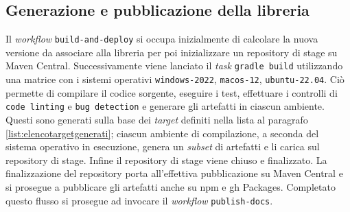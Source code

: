 \documentclass[12pt,a4paper,openright,twoside]{book}
\begin{document}
\subsection{Generazione e pubblicazione della libreria}
Il \textit{workflow} \texttt{build-and-deploy} si occupa inizialmente di
calcolare la nuova versione da associare
alla libreria per poi inizializzare un repository di stage su Maven Central.
Successivamente viene lanciato il \textit{task} \texttt{gradle build} utilizzando una matrice con i sistemi operativi
 \texttt{windows-2022}, \texttt{macos-12}, \texttt{ubuntu-22.04}. Ciò permette di compilare il codice sorgente, 
 eseguire i test, effettuare i controlli di \texttt{code linting} e \texttt{bug detection} e generare gli artefatti
 in ciascun ambiente. Questi sono generati sulla base dei \textit{target} definiti nella lista al paragrafo \ref{list:elencotargetgenerati};
ciascun ambiente di compilazione, a seconda del sistema operativo in esecuzione, genera un \textit{subset} di artefatti e li carica sul repository di stage.
Infine il repository di stage viene chiuso e finalizzato. 
La finalizzazione del repository porta all'effettiva pubblicazione su Maven Central e si prosegue a pubblicare gli artefatti
anche su \ac{npm} e \ac{gh} Packages.
Completato questo flusso si prosegue ad invocare il \textit{workflow} \texttt{publish-docs}.
\end{document}
